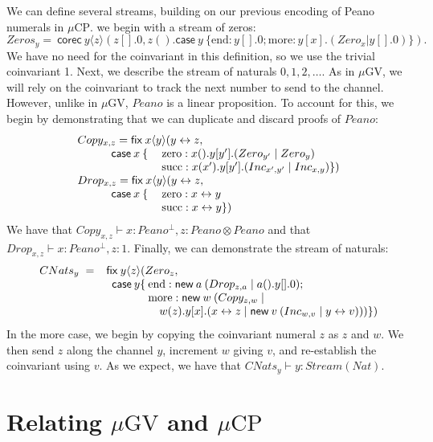\documentclass[orivec,envcountsame]{llncs}
\newcommand{\cpdual}[1]{#1^\perp}
\newcommand{\cptyp}[2]{#1 \vdash #2}
\newcommand{\mkwd}[1]{\mathsf{#1}}
\newcommand{\link}[2]{#1 \leftrightarrow #2}
\newcommand{\cut}[4]{\mkwd{new}\:#1 \: (#3 \mid #4)}
\newcommand{\corec}[5]{\mkwd{corec}\:#1 \langle #2 \rangle (#4,#5)}
\newcommand{\clabel}[1]{\mathrm{#1}}
\renewcommand{\case}[2]{\mkwd{case}\:#1\:\{#2\}}
\newcommand{\lrkwd}{\mkwd{fix}}
\newcommand{\mucp}{$\mu\mathrm{CP}$\xspace}
\newcommand{\mugv}{$\mu\mathrm{GV}$\xspace}
\begin{document}
We can define several streams, building on our previous encoding of Peano numerals in \mucp.  we
begin with a stream of zeros:
\[
  Zeros_y =\ \corec{y}{z}{1}{z[].0}{z().\case{y}{\clabel{end}: y[].0; \clabel{more}: y[x].(Zero_x | y[].0)}}.
\]
We have no need for the coinvariant in this definition, so we use the trivial coinvariant 1.  Next,
we describe the stream of naturals $0,1,2,\dots$.  As in \mugv, we will rely on the coinvariant to
track the next number to send to the channel.  However, unlike in \mugv, $Peano$ is a linear
proposition.  To account for this, we begin by demonstrating that we can duplicate and discard
proofs of $Peano$:
\[\begin{array}{lll}
  \multicolumn{3}{l}{Copy_{x,z} = \lrkwd\:x\langle y \rangle ( \link{y}{z},} \\
  \quad \quad & \mkwd{case}\:x\:\{\:&\clabel{zero}: x().y[y'].(Zero_{y'} \mid Zero_{y}) \\
  & & \clabel{succ}: x(x').y[y'].(Inc_{x',y'} \mid Inc_{x,y}) \}) \\
  \multicolumn{3}{l}{Drop_{x,z} = \lrkwd\:x \langle y \rangle (\link{y}{z},} \\
  \quad \quad & \mkwd{case}\:x\:\{\:&\clabel{zero}: \link{x}{y} \\
  & & \clabel{succ}: \link{x}{y} \})
\end{array}\]
We have that $\cptyp{Copy_{x,z}}{x:\cpdual{Peano}, z:Peano \otimes Peano}$ and that
$\cptyp{Drop_{x,z}}{x:\cpdual{Peano},z:1}$. Finally, we can demonstrate the stream of naturals:
\[\begin{array}{r@{\hspace{2mm}}c@{\hspace{2mm}}l@{\hspace{0mm}}l@{\:}l}
  CNats_y & = & \mcl{3}{\lrkwd \: y \langle z \rangle (Zero_z,} \\
  & & \quad & \mkwd{case}\:y \{ & \clabel{end}: \cut{a}{}{Drop_{z,a}}{a().y[].0}; \\
  & & & & \clabel{more}: \mkwd{new}\:w\:(Copy_{z,w} \mid \\
  & & & & \quad w(z).y[x].(\link{x}{z} \mid \cut{v}{}{Inc_{w,v}}{\link{y}{v}}))\})
\end{array}\]
In the $\clabel{more}$ case, we begin by copying the coinvariant numeral $z$ as $z$ and $w$.  We
then send $z$ along the channel $y$, increment $w$ giving $v$, and re-establish the coinvariant
using $v$.  As we expect, we have that $\cptyp{CNats_y}{y:Stream(Nat)}$.

\section{Relating \mugv and \mucp}\label{sec:translation}
\end{document}
